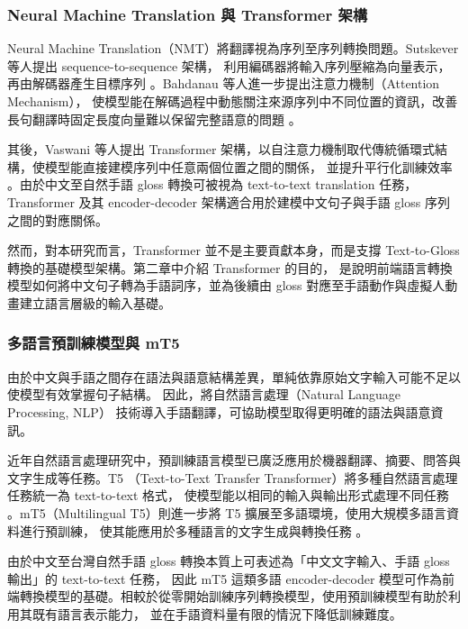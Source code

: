 \documentclass[class=NCU_thesis, crop=false]{standalone}
\begin{document}
\subsubsection{Neural Machine Translation 與 Transformer 架構}
\label{subsubsec:nmt_transformer}

Neural Machine Translation（NMT）將翻譯視為序列至序列轉換問題。Sutskever 等人提出 sequence-to-sequence 架構，
利用編碼器將輸入序列壓縮為向量表示，再由解碼器產生目標序列 \cite{sutskever2014sequence}。Bahdanau 等人進一步提出注意力機制（Attention Mechanism），
使模型能在解碼過程中動態關注來源序列中不同位置的資訊，改善長句翻譯時固定長度向量難以保留完整語意的問題 \cite{bahdanau2016neuralmachinetranslationjointly}。

其後，Vaswani 等人提出 Transformer 架構，以自注意力機制取代傳統循環式結構，使模型能直接建模序列中任意兩個位置之間的關係，
並提升平行化訓練效率 \cite{transformer}。由於中文至自然手語 gloss 轉換可被視為 text-to-text translation 任務，
Transformer 及其 encoder-decoder 架構適合用於建模中文句子與手語 gloss 序列之間的對應關係。

然而，對本研究而言，Transformer 並不是主要貢獻本身，而是支撐 Text-to-Gloss 轉換的基礎模型架構。第二章中介紹 Transformer 的目的，
是說明前端語言轉換模型如何將中文句子轉為手語詞序，並為後續由 gloss 對應至手語動作與虛擬人動畫建立語言層級的輸入基礎。

\subsubsection{多語言預訓練模型與 mT5}
\label{subsubsec:mt5}

由於中文與手語之間存在語法與語意結構差異，單純依靠原始文字輸入可能不足以使模型有效掌握句子結構。
因此，將自然語言處理（Natural Language Processing, NLP） \cite{jurafsky2025slp3}技術導入手語翻譯，可協助模型取得更明確的語法與語意資訊。

近年自然語言處理研究中，預訓練語言模型已廣泛應用於機器翻譯、摘要、問答與文字生成等任務。T5 （Text-to-Text Transfer Transformer）將多種自然語言處理任務統一為 text-to-text 格式，
使模型能以相同的輸入與輸出形式處理不同任務 \cite{raffel2023exploringlimitstransferlearning}。mT5（Multilingual T5）則進一步將 T5 擴展至多語環境，使用大規模多語言資料進行預訓練，
使其能應用於多種語言的文字生成與轉換任務 \cite{xue2021mt5massivelymultilingualpretrained}。

由於中文至台灣自然手語 gloss 轉換本質上可表述為「中文文字輸入、手語 gloss 輸出」的 text-to-text 任務，
因此 mT5 這類多語 encoder-decoder 模型可作為前端轉換模型的基礎。相較於從零開始訓練序列轉換模型，使用預訓練模型有助於利用其既有語言表示能力，
並在手語資料量有限的情況下降低訓練難度。
\end{document}

